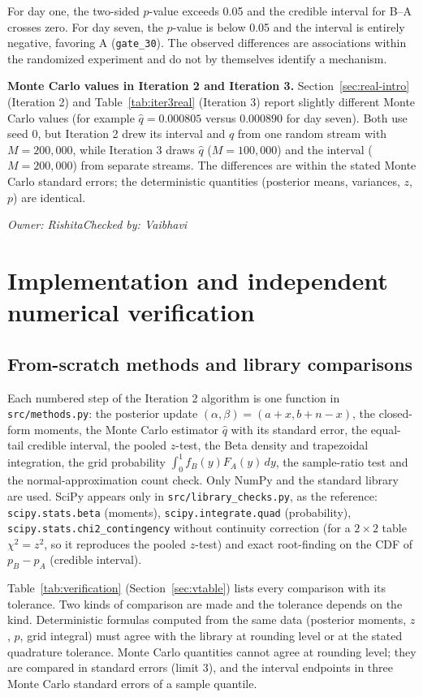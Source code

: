 \documentclass[11pt]{article}
\newcommand{\signoff}[2]{\par\smallskip\noindent\textit{Owner: #1\quad Checked by: #2}\par}
\begin{document}
For day one, the two-sided $p$-value exceeds 0.05 and the credible interval for B--A crosses zero. For day seven, the $p$-value is below 0.05 and the interval is entirely negative, favoring A (\texttt{gate\_30}). The observed differences are associations within the randomized experiment and do not by themselves identify a mechanism.

\textbf{Monte Carlo values in Iteration 2 and Iteration 3.} Section~\ref{sec:real-intro} (Iteration 2) and Table~\ref{tab:iter3real} (Iteration 3) report slightly different Monte Carlo values (for example $\hat q=0.000805$ versus $0.000890$ for day seven). Both use seed 0, but Iteration 2 drew its interval and $\hat q$ from one random stream with $M=200{,}000$, while Iteration 3 draws $\hat q$ ($M=100{,}000$) and the interval ($M=200{,}000$) from separate streams. The differences are within the stated Monte Carlo standard errors; the deterministic quantities (posterior means, variances, $z$, $p$) are identical.
\signoff{Rishita}{Vaibhavi}



\section{Implementation and independent numerical verification}
\subsection{From-scratch methods and library comparisons}
Each numbered step of the Iteration 2 algorithm is one function in \texttt{src/methods.py}: the posterior update $(\alpha,\beta)=(a+x,b+n-x)$, the closed-form moments, the Monte Carlo estimator $\hat q$ with its standard error, the equal-tail credible interval, the pooled $z$-test, the Beta density and trapezoidal integration, the grid probability $\int_0^1 f_B(y)F_A(y)\,dy$, the sample-ratio test and the normal-approximation count check. Only NumPy and the standard library are used. SciPy appears only in \texttt{src/library\_checks.py}, as the reference: \texttt{scipy.stats.beta} (moments), \texttt{scipy.integrate.quad} (probability), \texttt{scipy.stats.chi2\_contingency} without continuity correction (for a $2\times2$ table $\chi^2=z^2$, so it reproduces the pooled $z$-test) and exact root-finding on the CDF of $p_B-p_A$ (credible interval).

Table~\ref{tab:verification} (Section~\ref{sec:vtable}) lists every comparison with its tolerance. Two kinds of comparison are made and the tolerance depends on the kind. Deterministic formulas computed from the same data (posterior moments, $z$, $p$, grid integral) must agree with the library at rounding level or at the stated quadrature tolerance. Monte Carlo quantities cannot agree at rounding level; they are compared in standard errors (limit 3), and the interval endpoints in three Monte Carlo standard errors of a sample quantile.
\end{document}
